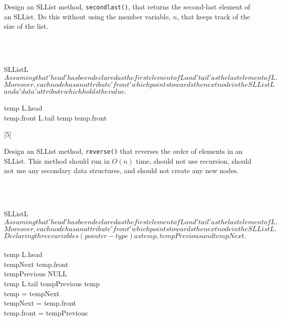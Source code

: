 \documentclass[addpoints]{exam}
\begin{document}
\begin{questions}
	Design an SLList method, {\tt second\textunderscore last()}, that returns the second-last element of an SLList. Do this without using the member variable, $n$, that keeps track of the size of the list.
	\begin{solution}\\ \\
		\begin{pseudocode}{SLList}{L}
			\label{SLList}
			\\
			$Assuming that 'head' has been declared as the first element of L and 'tail' as the last element of L.$\\ $Moreover, each node has an attribute 'front' which points towards the next node in the SLList L $\\ $and a 'data' attribute which holds the value.$ \\ \\
				temp \GETS L.head\\
				\WHILE temp.front \neq L.tail \DO
					temp \leftarrow temp.front \\
			\ENDPROCEDURE
		\end{pseudocode}
	\end{solution}
	\pagebreak
	
	
	Design an SLList method, {\tt reverse()} that reverses the order of elements in an SLList. This method should run in $O(n)$ time, should not use recursion, should not use any secondary data structures, and should not create any new nodes.
	\begin{solution}\\ \\
		\begin{pseudocode}{SLList}{L}
			\label{SLList}
			\\
			$Assuming that 'head' has been declared as the first element of L and 'tail' as the last element of L.$\\ $Moreover, each node has an attribute 'front' which points towards the next node in the SLList L.$\\ $Declaring three variables (pointer-type) as \textit{temp}, \textit{tempPrevious} and \textit{tempNext}.$ \\ \\
				temp \GETS L.head\\
				tempNext \GETS temp.front\\
				tempPrevious \GETS NULL\\
				\WHILE temp \neq L.tail \DO
					\BEGIN
						tempPrevious \GETS temp\\
						temp = tempNext \\
						tempNext = temp.front \\
						temp.front = tempPrevious \\
					\END \\	
			\ENDPROCEDURE
		\end{pseudocode}
	\end{solution}
	\pagebreak
	

\end{questions}
\end{document}
